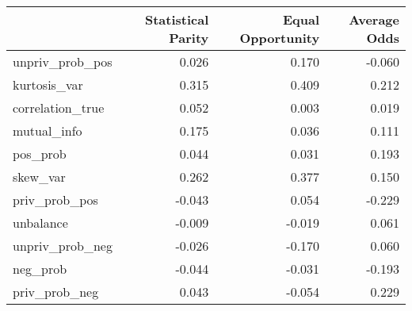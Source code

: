 \begin{tabular}{lrrr}
\toprule
 & Statistical Parity & Equal Opportunity & Average Odds \\
\midrule
unpriv_prob_pos & 0.026 & 0.170 & -0.060 \\
kurtosis_var & 0.315 & 0.409 & 0.212 \\
correlation_true & 0.052 & 0.003 & 0.019 \\
mutual_info & 0.175 & 0.036 & 0.111 \\
pos_prob & 0.044 & 0.031 & 0.193 \\
skew_var & 0.262 & 0.377 & 0.150 \\
priv_prob_pos & -0.043 & 0.054 & -0.229 \\
unbalance & -0.009 & -0.019 & 0.061 \\
unpriv_prob_neg & -0.026 & -0.170 & 0.060 \\
neg_prob & -0.044 & -0.031 & -0.193 \\
priv_prob_neg & 0.043 & -0.054 & 0.229 \\
\bottomrule
\end{tabular}
